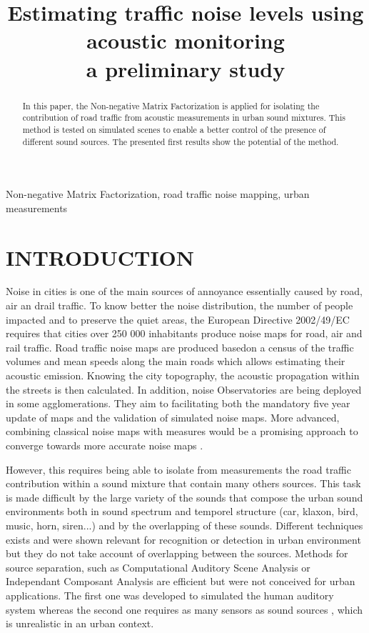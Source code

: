 \documentclass{article}
\title{Estimating traffic noise levels using acoustic monitoring \\ a preliminary study}
\begin{document}
\ninept
\maketitle

\begin{sloppy}

\begin{abstract}
In this paper, the Non-negative Matrix Factorization is applied for isolating the contribution of road traffic from acoustic measurements in urban sound mixtures. This method is tested on simulated scenes to enable a better control of the presence of different sound sources. The presented first results show the potential of the method.
\end{abstract}

\begin{keywords}
Non-negative Matrix Factorization, road traffic noise mapping, urban measurements
\end{keywords}

\section{INTRODUCTION}
\label{sec:motivations}

Noise in cities is one of the main sources of annoyance essentially caused by road, air an drail traffic. To know better the noise distribution, the number of people impacted and to preserve the quiet areas, the European Directive 2002/49/EC \cite{directive} requires that cities over 250 000 inhabitants produce noise maps for road, air and rail traffic. Road traffic noise maps are produced basedon a census of the traffic volumes and mean speeds along the main roads which allows estimating their acoustic emission. Knowing the city topography, the acoustic propagation within the streets is then calculated. In addition, noise Observatories are being deployed in some agglomerations. They aim to facilitating both the mandatory five year update of maps and the validation of simulated noise maps. More advanced, combining classical noise maps with measures would be a promising approach to converge towards more accurate noise maps \cite{Can} \cite{deCoensel}.


However, this requires being able to isolate from measurements the road traffic contribution within a sound mixture that contain many others sources. This task is made difficult by the large variety of the sounds that compose the urban sound environments both in sound spectrum and temporel structure (car, klaxon, bird, music, horn, siren...) and by the overlapping of these sounds. Different techniques exists and were shown relevant for recognition or detection in urban environment \cite{Aucouturier} \cite{defreville} but they do not take account of overlapping between the sources. Methods for source separation, such as Computational Auditory Scene Analysis or Independant Composant Analysis are efficient but were not conceived for urban applications. The first one was developed to simulated the human auditory system \cite{brown} whereas the second one requires as many sensors as sound sources \cite{Comon}, which is unrealistic in an urban context.


\end{sloppy}
\end{document}
